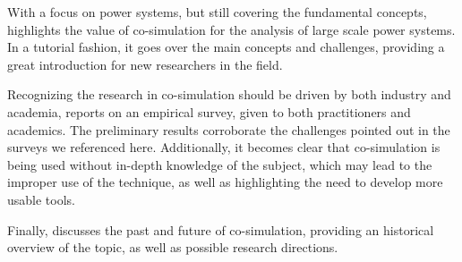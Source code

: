 With a focus on power systems, but still covering the fundamental concepts, \cite{Palensky2017} highlights the value of co-simulation for the analysis of large scale power systems. 
In a tutorial fashion, it goes over the main concepts and challenges, providing a great introduction for new researchers in the field.

Recognizing the research in co-simulation should be driven by both industry and academia, \cite{Schweiger2018a} reports on an empirical survey, given to both practitioners and academics.
The preliminary results  corroborate the challenges pointed out in the surveys we referenced here.
Additionally, it becomes clear that co-simulation is being used without in-depth knowledge of the subject, which may lead to the improper use of the technique, as well as highlighting the need to develop more usable tools.

Finally, \cite{Gomes2018b} discusses the past and future of co-simulation, providing an historical overview of the topic, as well as possible research directions.

